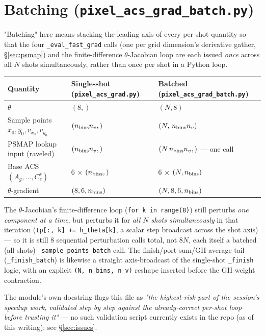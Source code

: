 \documentclass[11pt,a4paper]{article}
\newcommand{\code}[1]{\texttt{#1}}
\begin{document}
\section{Batching (\code{pixel\_acs\_grad\_batch.py})}
\label{sec:batching}

"Batching" here means stacking the leading axis of every per-shot
quantity so that the four \code{\_eval\_fast\_grad} calls (one per grid
dimension's derivative gather, \S\ref{sec:psmap}) and the finite-difference
$\theta$-Jacobian loop are each issued \emph{once} across all $N$ shots
simultaneously, rather than once per shot in a Python loop.

\begin{center}
\begin{tabular}{@{}lll@{}}
\toprule
Quantity & Single-shot (\code{pixel\_acs\_grad.py}) & Batched (\code{pixel\_acs\_grad\_batch.py}) \\
\midrule
$\theta$ & $(8,)$ & $(N,8)$ \\
Sample points $x_0,y_0,v_{x_0},v_{y_0}$ & $(n_{\rm bins}n_v,)$ & $(N,\,n_{\rm bins}n_v)$ \\
PSMAP lookup input (raveled) & $(n_{\rm bins}n_v,)$ & $(N\,n_{\rm bins}n_v,)$ --- one call \\
Base ACS $(A_g,\ldots,C^s_e)$ & 6 $\times$ $(n_{\rm bins},)$ & 6 $\times$ $(N,n_{\rm bins})$ \\
$\theta$-gradient & $(8,6,n_{\rm bins})$ & $(N,8,6,n_{\rm bins})$ \\
\bottomrule
\end{tabular}
\end{center}

The $\theta$-Jacobian's finite-difference loop (\code{for k in range(8)})
still perturbs \emph{one component at a time}, but perturbs it for
\emph{all $N$ shots simultaneously} in that iteration
(\code{tp[:, k] += h\_theta[k]}, a scalar step broadcast across the shot
axis) --- so it is still 8 sequential perturbation calls total, not
$8N$, each itself a batched (all-shots) \code{\_sample\_points\_batch}
call. The finish/port-sum/GH-average tail (\code{\_finish\_batch}) is
likewise a straight axis-broadcast of the single-shot \code{\_finish}
logic, with an explicit \code{(N, n\_bins, n\_v)} reshape inserted before
the GH weight contraction.

The module's own docstring flags this file as \emph{"the highest-risk part
of the session's speedup work, validated step by step against the
already-correct per-shot loop before trusting it"} --- no such validation
script currently exists in the repo (as of this writing); see
\S\ref{sec:issues}.
\end{document}

